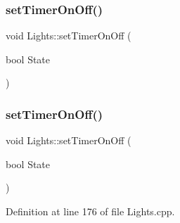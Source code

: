 \subsubsection{\texorpdfstring{set\+Timer\+On\+Off()}{setTimerOnOff()}\hspace{0.1cm}{\footnotesize\ttfamily [1/2]}}
{\footnotesize\ttfamily void Lights\+::set\+Timer\+On\+Off (\begin{DoxyParamCaption}\item[{bool}]{State }\end{DoxyParamCaption})\hspace{0.3cm}{\ttfamily [protected]}}

\mbox{\label{class_lights_a3c5051babf4dacdeecced14217f6f886}} 
\subsubsection{\texorpdfstring{set\+Timer\+On\+Off()}{setTimerOnOff()}\hspace{0.1cm}{\footnotesize\ttfamily [2/2]}}
{\footnotesize\ttfamily void Lights\+::set\+Timer\+On\+Off (\begin{DoxyParamCaption}\item[{bool}]{State }\end{DoxyParamCaption})\hspace{0.3cm}{\ttfamily [protected]}}



Definition at line 176 of file Lights.\+cpp.

